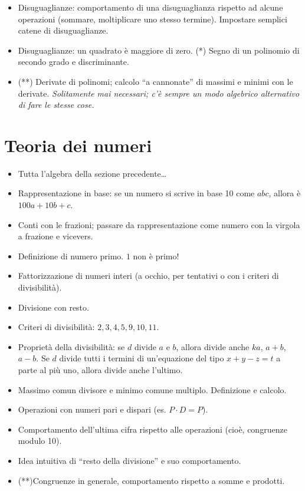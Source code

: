 \documentclass[a4paper,10pt]{paper}
\renewcommand{\star}{(*)}
\newcommand{\sstar}{(**)}
\begin{document}
\begin{itemize}
 \item Disuguaglianze: comportamento di una disuguaglianza rispetto ad alcune operazioni (sommare, moltiplicare uno stesso termine). Impostare semplici catene di disuguaglianze.
 \item Disuguaglianze: un quadrato è maggiore di zero. \star{} Segno di un polinomio di secondo grado e discriminante.
 \item \sstar{} Derivate di polinomi; calcolo ``a cannonate'' di massimi e minimi con le derivate. \emph{Solitamente mai necessari; c'è sempre un modo algebrico alternativo di fare le stesse cose.}
\end{itemize}

\section{Teoria dei numeri}
\begin{itemize}
 \item Tutta l'algebra della sezione precedente\dots
 \item Rappresentazione in base: se un numero si scrive in base 10 come $abc$, allora è $100a+10b+c$.
 \item Conti con le frazioni; passare da rappresentazione come numero con la virgola a frazione e vicevers.
 \item Definizione di numero primo. $1$ non è primo!
 \item Fattorizzazione di numeri interi (a occhio, per tentativi o con i criteri di divisibilità).
 \item Divisione con resto.
 \item Criteri di divisibilità: $2,3,4,5,9,10,11$.
 \item Proprietà della divisibilità: se $d$ divide $a$ e $b$, allora divide anche $ka$, $a+b$, $a-b$. Se $d$ divide tutti i termini di un'equazione del tipo $x+y-z=t$ a parte al più uno, allora divide anche l'ultimo.
 \item Massimo comun divisore e minimo comune multiplo. Definizione e calcolo.
 \item Operazioni con numeri pari e dispari (es. $P\cdot D=P$).
 \item Comportamento dell'ultima cifra rispetto alle operazioni (cioè, congruenze modulo 10).
 \item Idea intuitiva di ``resto della divisione'' e suo comportamento.
 \item \sstar Congruenze in generale, comportamento rispetto a somme e prodotti.
\end{itemize}
\end{document}
